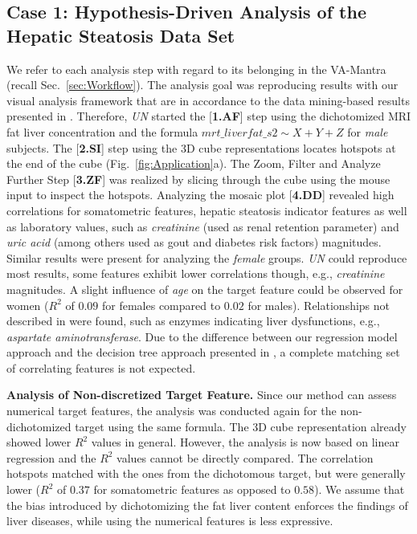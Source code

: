 \documentclass[journal]{style/vgtc} 			          %
\begin{document}
\subsection{Case 1: Hypothesis-Driven Analysis of the Hepatic Steatosis Data Set}
We refer to each analysis step with regard to its belonging in the VA-Mantra (recall Sec.~\ref{sec:Workflow}).
The analysis goal was reproducing results with our visual analysis framework that are in accordance to the data mining-based results presented in \cite{Niemann2014}.
Therefore, \emph{UN} started the [\textbf{1.AF}] step using the dichotomized MRI fat liver concentration and the formula $mrt\_liverfat\_s2 \sim X + Y + Z$ for \emph{male} subjects.
The [\textbf{2.SI}] step using the 3D cube representations locates hotspots at the end of the cube (Fig.~\ref{fig:Application}a).
The Zoom, Filter and Analyze Further Step [\textbf{3.ZF}] was realized by slicing through the cube using the mouse input to inspect the hotspots.
Analyzing the mosaic plot [\textbf{4.DD}] revealed high correlations for somatometric features, hepatic steatosis indicator features as well as laboratory values, such as \emph{creatinine} (used as renal retention parameter) and \emph{uric acid} (among others used as gout and diabetes risk factors) magnitudes.
Similar results were present for analyzing the \emph{female} groups.
\emph{UN} could reproduce most results, some features exhibit lower correlations though, e.g., \emph{creatinine} magnitudes.
A slight influence of \emph{age} on the target feature could be observed for women ($R^2$ of $0.09$ for females compared to $0.02$ for males).
Relationships not described in \cite{Niemann2014} were found, such as enzymes indicating liver dysfunctions, e.g., \emph{aspartate aminotransferase}.
%
Due to the difference between our regression model approach and the decision tree approach presented in \cite{Niemann2014}, a complete matching set of correlating features is not expected.

\textbf{Analysis of Non-discretized Target Feature.}
Since our method can assess numerical target features, the analysis was conducted again for the non-dichotomized target using the same formula.
The 3D cube representation already showed lower $R^2$ values in general. However, the analysis is now based on linear regression and the $R^2$ values cannot be directly compared.
The correlation hotspots matched with the ones from the dichotomous target, but were generally lower ($R^2$ of $0.37$ for somatometric features as opposed to $0.58$).
We assume that the bias introduced by dichotomizing the fat liver content enforces the findings of liver diseases, while using the numerical features is less expressive.
\end{document}

